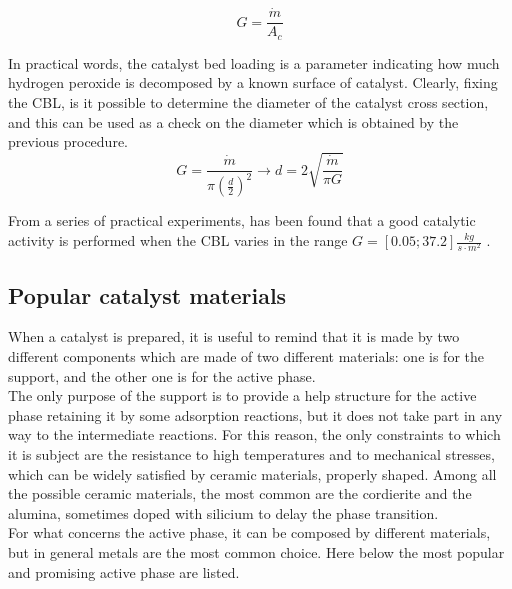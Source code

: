 \documentclass[a4paper]{report}
\begin{document}
\begin{equation}
G=\frac{\dot{m}}{A_c}
\end{equation}

In practical words, the catalyst bed loading is a parameter indicating how much hydrogen peroxide is decomposed by a known surface of catalyst. Clearly, fixing the CBL, is it possible to determine the diameter of the catalyst cross section, and this can be used as a check on the diameter which is obtained by the previous procedure. \\

\begin{equation}
G=\frac{\dot{m}}{\pi (\frac{d}{2})^2} \rightarrow
d=2\sqrt{\frac{\dot{m}}{\pi G}}
\end{equation}

From a series of practical experiments, has been found that a good catalytic activity is performed when the CBL varies in the range $G=[0.05;37.2]\frac{kg}{s \cdot m^2}$ . \\ %

\subsection{Popular catalyst materials}

When a catalyst is prepared, it is useful to remind that it is made by two different components which are made of two different materials: one is for the support, and the other one is for the active phase. \\
The only purpose of the support is to provide a help structure for the active phase retaining it by some adsorption reactions, but it does not take part in any way to the intermediate reactions. For this reason, the only constraints to which it is subject are the resistance to high temperatures and to mechanical stresses, which can be widely satisfied by ceramic materials, properly shaped. Among all the possible ceramic materials, the most common are the cordierite and the alumina, sometimes doped with silicium to delay the phase transition.\\
For what concerns the active phase, it can be composed by different materials, but in general metals are the most common choice. Here below the most popular and promising active phase are listed. 
\end{document}
